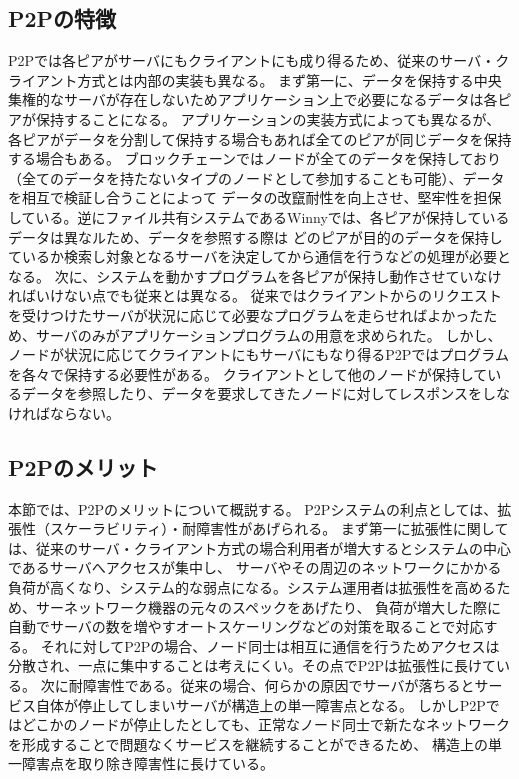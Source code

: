 \subsection{P2Pの特徴}
P2Pでは各ピアがサーバにもクライアントにも成り得るため、従来のサーバ・クライアント方式とは内部の実装も異なる。
まず第一に、データを保持する中央集権的なサーバが存在しないためアプリケーション上で必要になるデータは各ピアが保持することになる。
アプリケーションの実装方式によっても異なるが、各ピアがデータを分割して保持する場合もあれば全てのピアが同じデータを保持する場合もある。
ブロックチェーンではノードが全てのデータを保持しており（全てのデータを持たないタイプのノードとして参加することも可能）、データを相互で検証し合うことによって
データの改竄耐性を向上させ、堅牢性を担保している。逆にファイル共有システムであるWinnyでは、各ピアが保持しているデータは異なルため、データを参照する際は
どのピアが目的のデータを保持しているか検索し対象となるサーバを決定してから通信を行うなどの処理が必要となる。
次に、システムを動かすプログラムを各ピアが保持し動作させていなければいけない点でも従来とは異なる。
従来ではクライアントからのリクエストを受けつけたサーバが状況に応じて必要なプログラムを走らせればよかったため、サーバのみがアプリケーションプログラムの用意を求められた。
しかし、ノードが状況に応じてクライアントにもサーバにもなり得るP2Pではプログラムを各々で保持する必要性がある。
クライアントとして他のノードが保持しているデータを参照したり、データを要求してきたノードに対してレスポンスをしなければならない。

\subsection{P2Pのメリット}
本節では、P2Pのメリットについて概説する。
P2Pシステムの利点としては、拡張性（スケーラビリティ）・耐障害性があげられる。
まず第一に拡張性に関しては、従来のサーバ・クライアント方式の場合利用者が増大するとシステムの中心であるサーバへアクセスが集中し、
サーバやその周辺のネットワークにかかる負荷が高くなり、システム的な弱点になる。システム運用者は拡張性を高めるため、サーネットワーク機器の元々のスペックをあげたり、
負荷が増大した際に自動でサーバの数を増やすオートスケーリングなどの対策を取ることで対応する。
それに対してP2Pの場合、ノード同士は相互に通信を行うためアクセスは分散され、一点に集中することは考えにくい。その点でP2Pは拡張性に長けている。
次に耐障害性である。従来の場合、何らかの原因でサーバが落ちるとサービス自体が停止してしまいサーバが構造上の単一障害点となる。
しかしP2Pではどこかのノードが停止したとしても、正常なノード同士で新たなネットワークを形成することで問題なくサービスを継続することができるため、
構造上の単一障害点を取り除き障害性に長けている。

